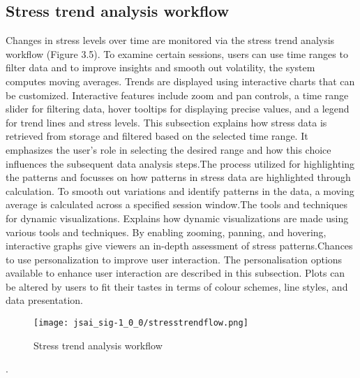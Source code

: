 \documentclass[a4j, twocolumn]{article}
\begin{document}
\subsection{Stress trend analysis workflow}
Changes in stress levels over time are monitored via the stress trend analysis workflow (Figure 3.5). To examine certain sessions, users can use time ranges to filter data and to improve insights and smooth out volatility, the system computes moving averages. Trends are displayed using interactive charts that can be customized. Interactive features include zoom and pan controls, a time range slider for filtering data, hover tooltips for displaying precise values, and a legend for trend lines and stress levels. This subsection explains how stress data is retrieved from storage and filtered based on the selected time range. It emphasizes the user’s role in selecting the desired range and how this choice influences the subsequent data analysis steps.The process utilized for highlighting the patterns and focusses on how patterns in stress data are highlighted through calculation. To smooth out variations and identify patterns in the data, a moving average is calculated across a specified session window.The tools and techniques for dynamic visualizations. Explains how dynamic visualizations are made using various tools and techniques. By enabling zooming, panning, and hovering, interactive graphs give viewers an in-depth assessment of stress patterns.Chances to use personalization to improve user interaction. The personalisation options available to enhance user interaction are described in this subsection. Plots can be altered by users to fit their tastes in terms of colour schemes, line styles, and data presentation.
\vspace{10pt} %
\begin{figure}[H]
    \centering
    \texttt{[image: jsai\_sig-1\_0\_0/stresstrendflow.png]}
    \caption{Stress trend analysis workflow}
    \label{fig:system_architecture}
\end{figure}
\vspace{10pt} %
. %
\end{document}
